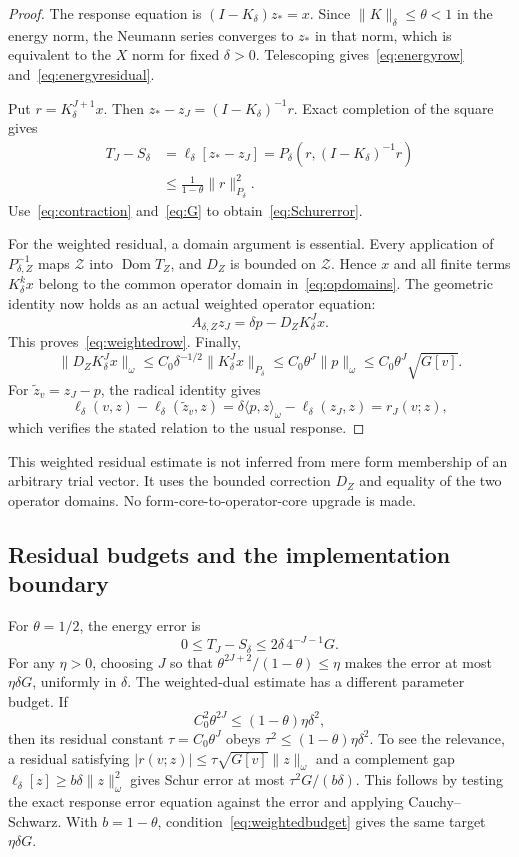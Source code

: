 \documentclass[11pt,a4paper]{article}
\numberwithin{equation}{section}
\theoremstyle{remark}
\newcommand{\dom}{\operatorname{Dom}}
\newcommand{\ip}[2]{\langle #1,#2\rangle}
\newcommand{\norm}[1]{\lVert #1\rVert}
\newcommand{\Zc}{\mathcal Z}
\begin{document}
\begin{proof}
The response equation is $(I-K_\delta)z_*=x$. Since $\norm K_\delta\le\theta<1$ in the energy norm, the Neumann series converges to $z_*$ in that norm, which is equivalent to the $X$ norm for fixed $\delta>0$. Telescoping gives~\eqref{eq:energyrow} and~\eqref{eq:energyresidual}.

Put $r=K_\delta^{J+1}x$. Then
$z_*-z_J=(I-K_\delta)^{-1}r$. Exact completion of the square gives
\begin{align*}
 T_J-S_\delta
 &=\ell_\delta[z_*-z_J]
 =P_\delta(r,(I-K_\delta)^{-1}r)\\
 &\le\frac1{1-\theta}\norm r_{P_\delta}^2.
\end{align*}
Use~\eqref{eq:contraction} and~\eqref{eq:G} to obtain~\eqref{eq:Schurerror}.

For the weighted residual, a domain argument is essential. Every application of $P_{\delta,Z}^{-1}$ maps $\Zc$ into $\dom T_Z$, and $D_Z$ is bounded on $\Zc$. Hence $x$ and all finite terms $K_\delta^kx$ belong to the common operator domain in~\eqref{eq:opdomains}. The geometric identity now holds as an actual weighted operator equation:
\[
 A_{\delta,Z}z_J=\delta p-D_ZK_\delta^Jx.
\]
This proves~\eqref{eq:weightedrow}. Finally,
\[
 \norm{D_ZK_\delta^Jx}_\omega
 \le C_0\delta^{-1/2}\norm{K_\delta^Jx}_{P_\delta}
 \le C_0\theta^J\norm p_\omega
 \le C_0\theta^J\sqrt{G[v]}.
\]
For $\widetilde z_v=z_J-p$, the radical identity gives
\[
 \ell_\delta(v,z)-\ell_\delta(\widetilde z_v,z)
 =\delta\ip pz_\omega-\ell_\delta(z_J,z)=r_J(v;z),
\]
which verifies the stated relation to the usual response.
\end{proof}

This weighted residual estimate is not inferred from mere form membership of an arbitrary trial vector. It uses the bounded correction $D_Z$ and equality of the two operator domains. No form-core-to-operator-core upgrade is made.

\subsection{Residual budgets and the implementation boundary}

For $\theta=1/2$, the energy error is
\begin{equation}\label{eq:halferror}
 0\le T_J-S_\delta\le2\delta\,4^{-J-1}G.
\end{equation}
For any $\eta>0$, choosing $J$ so that
$\theta^{2J+2}/(1-\theta)\le\eta$ makes the error at most $\eta\delta G$, uniformly in $\delta$. The weighted-dual estimate has a different parameter budget. If
\begin{equation}\label{eq:weightedbudget}
 C_0^2\theta^{2J}\le(1-\theta)\eta\delta^2,
\end{equation}
then its residual constant $\tau=C_0\theta^J$ obeys
$\tau^2\le(1-\theta)\eta\delta^2$.
To see the relevance, a residual satisfying
$|r(v;z)|\le\tau\sqrt{G[v]}\norm z_\omega$ and a complement gap
$\ell_\delta[z]\ge b\delta\norm z_\omega^2$ gives Schur error at most
$\tau^2G/(b\delta)$. This follows by testing the exact response error equation against the error and applying Cauchy--Schwarz. With $b=1-\theta$, condition~\eqref{eq:weightedbudget} gives the same target $\eta\delta G$.
\end{document}
